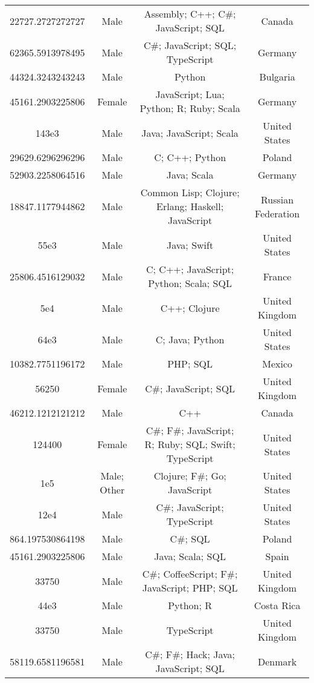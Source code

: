\begin{center}
\begin{tabular}{ |c|c|c|c| }
22727.2727272727  &  Male  &  Assembly; C++; C\#; JavaScript; SQL  &  Canada  \\ 
62365.5913978495  &  Male  &  C\#; JavaScript; SQL; TypeScript  &  Germany  \\ 
44324.3243243243  &  Male  &  Python  &  Bulgaria  \\ 
45161.2903225806  &  Female  &  JavaScript; Lua; Python; R; Ruby; Scala  &  Germany  \\ 
143e3  &  Male  &  Java; JavaScript; Scala  &  United States  \\ 
29629.6296296296  &  Male  &  C; C++; Python  &  Poland  \\ 
52903.2258064516  &  Male  &  Java; Scala  &  Germany  \\ 
18847.1177944862  &  Male  &  Common Lisp; Clojure; Erlang; Haskell; JavaScript  &  Russian Federation  \\ 
55e3  &  Male  &  Java; Swift  &  United States  \\ 
25806.4516129032  &  Male  &  C; C++; JavaScript; Python; Scala; SQL  &  France  \\ 
5e4  &  Male  &  C++; Clojure  &  United Kingdom  \\ 
64e3  &  Male  &  C; Java; Python  &  United States  \\ 
10382.7751196172  &  Male  &  PHP; SQL  &  Mexico  \\ 
56250  &  Female  &  C\#; JavaScript; SQL  &  United Kingdom  \\ 
46212.1212121212  &  Male  &  C++  &  Canada  \\ 
124400  &  Female  &  C\#; F\#; JavaScript; R; Ruby; SQL; Swift; TypeScript  &  United States  \\ 
1e5  &  Male; Other  &  Clojure; F\#; Go; JavaScript  &  United States  \\ 
12e4  &  Male  &  C\#; JavaScript; TypeScript  &  United States  \\ 
864.197530864198  &  Male  &  C\#; SQL  &  Poland  \\ 
45161.2903225806  &  Male  &  Java; Scala; SQL  &  Spain  \\ 
33750  &  Male  &  C\#; CoffeeScript; F\#; JavaScript; PHP; SQL  &  United Kingdom  \\ 
44e3  &  Male  &  Python; R  &  Costa Rica  \\ 
33750  &  Male  &  TypeScript  &  United Kingdom  \\ 
58119.6581196581  &  Male  &  C\#; F\#; Hack; Java; JavaScript; SQL  &  Denmark  \\ 

\end{tabular}
\end{center}
